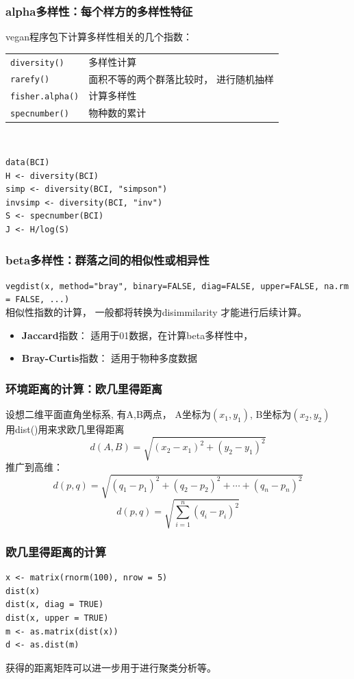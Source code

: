 \documentclass[UTF8]{ctexbeamer}
\begin{document}
\begin{frame}[fragile]
\frametitle{alpha多样性：每个样方的多样性特征}
vegan程序包下计算多样性相关的几个指数： \\
\begin{tabular}{ll}
{\tt diversity()} &多样性计算\\
{\tt rarefy()  } &面积不等的两个群落比较时， 进行随机抽样\\
{\tt fisher.alpha()} &计算多样性\\
{\tt specnumber() } &物种数的累计\\
\end{tabular}\\


\begin{verbatim}
data(BCI)
H <- diversity(BCI)
simp <- diversity(BCI, "simpson")
invsimp <- diversity(BCI, "inv")
S <- specnumber(BCI)
J <- H/log(S)
\end{verbatim}
\end{frame}

\begin{frame}
\frametitle{beta多样性：群落之间的相似性或相异性}

{\tt{vegdist(x, method="bray", binary=FALSE, diag=FALSE, upper=FALSE, na.rm = FALSE, ...)}}\\ 
相似性指数的计算， 一般都将转换为disimmilarity 才能进行后续计算。 \\
\begin{itemize}
\item {\textbf{Jaccard}}指数： 适用于01数据，在计算beta多样性中， \\
\item {\textbf{Bray-Curtis}}指数： 适用于物种多度数据\\
\end{itemize}
\end{frame}


\begin{frame}
\frametitle{环境距离的计算：欧几里得距离}
设想二维平面直角坐标系, 有A,B两点， A坐标为$(x_1, y_1)$, B坐标为$(x_2, y_2)$\\
用dist()用来求欧几里得距离\\
\[d(A,B) = \sqrt{(x_2-x_1)^2 + (y_2-y_1)^2}\]
推广到高维：\\
\[d(p,q)=\sqrt{(q_1-p_1)^2 + (q_2-p_2)^2 + \cdots + (q_n-p_n)^2} \]
\[d(p,q)= \sqrt{\sum_{i=1}^n (q_i-p_i)^2}\]
\end{frame}


\begin{frame}[fragile]
\frametitle{欧几里得距离的计算}
\begin{verbatim}
x <- matrix(rnorm(100), nrow = 5)
dist(x)
dist(x, diag = TRUE)
dist(x, upper = TRUE)
m <- as.matrix(dist(x))
d <- as.dist(m)
\end{verbatim}
获得的距离矩阵可以进一步用于进行聚类分析等。 
\end{frame}
\end{document}
